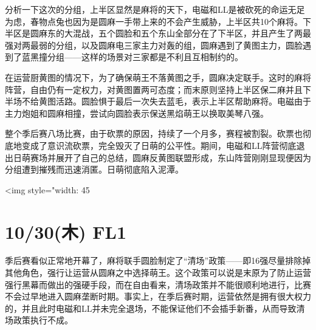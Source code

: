 分析一下这次的分组，上半区显然是麻将的天下，电磁和LL是被砍死的命运无足为虑，春物点兔也因为是圆麻一手带上来的不会产生威胁，上半区共10个麻将。下半区是圆麻东的大混战，五个圆脸和五个东山全部分在了下半区，并且产生了两最强对两最弱的分组，以及圆麻电三家主力对轰的组，圆麻遇到了黄图主力，圆脸遇到了蓝黑撞分组——这样的场景对三家都是不利且互相制约的。

在运营厨黄图的情况下，为了确保萌王不落黄图之手，圆麻决定联手。这时的麻将阵营，自由仍有一定权力，对黄图置两可态度；而末原则坚持上半区保二麻并且下半场不给黄图活路。圆脸惧于最后一次失去蓝毛，表示上半区帮助麻将。电磁由于主力炮姐和圆麻相撞，尝试向圆脸表示保送黑焰萌王以换取美琴八强。

整个季后赛八场比赛，由于砍票的原因，持续了一个月多，赛程被割裂。砍票也彻底地变成了意识流砍票，完全毁灭了日萌的公平性。期间，电磁和LL阵营彻底退出日萌赛场并展开了自己的总结，圆麻反黄图联盟形成，东山阵营刚刚显现便因为分组遭到摧残而迅速消匿。日萌彻底陷入泥潭。

<img style="width: 45%

\section{10/30(木) FL1}


季后赛看似正常地开幕了，麻将联手圆脸制定了“清场”政策——即16强尽量排除掉其他角色，强行让运营从圆麻之中选择萌王。这个政策可以说是末原为了防止运营强行黑幕而做出的强硬手段，而在自由看来，清场政策并不能很顺利地进行，比赛不会过早地进入圆麻垄断时期。事实上，在季后赛时期，运营依然是拥有很大权力的，并且此时电磁和LL并未完全退场，不能保证他们不会插手新番，从而导致清场政策执行不成。

